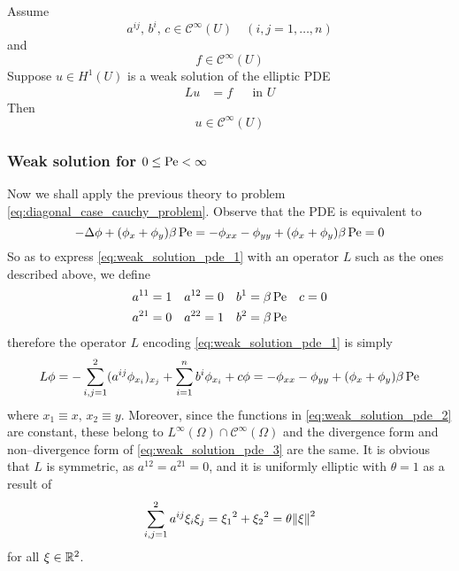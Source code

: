 \begin{theorem} \label{teo:infinite_differentiability_interior}
	Assume
	\[
		a^{ij}, \, b^i, \, c \in \mathcal{C}^\infty(U) \quad 
		(i,j = 1, \ldots, n)	
	\]
	and
	\[
		f \in \mathcal{C}^\infty(U)
	\]
	Suppose $u \in H^1(U)$ is a weak solution of the elliptic PDE
	\[
		\begin{aligned}
			L u &= f & &\text{in } U
		\end{aligned}	
	\]
	Then
	\[
		u \in \mathcal{C}^\infty(U)
	\]
\end{theorem}

\subsubsection*{Weak solution for \texorpdfstring{$0 \leq \mathrm{Pe} <
\infty$}{finite Péclet's number}}

Now we shall apply the previous theory to problem
\eqref{eq:diagonal_case_cauchy_problem}. Observe that the PDE is equivalent to
\begin{equation} \label{eq:weak_solution_pde_1}
	-\Delta \phi + (\phi_x + \phi_y) \beta \, \mathrm{Pe} = 
	-\phi_{xx} - \phi_{yy} + (\phi_x + \phi_y) \beta \, \mathrm{Pe} = 0
\end{equation}
So as to express \eqref{eq:weak_solution_pde_1} with an operator $L$ such as the
ones described above, we define
\begin{equation} \label{eq:weak_solution_pde_2}
	\begin{aligned}
		a^{11} &= 1 	& 	a^{12} &= 0 	& 	b^1 &= \beta \, \mathrm{Pe}	& 	c &= 0 \\
		a^{21} &= 0 	& 	a^{22} &= 1 	& 	b^2 &= \beta \, \mathrm{Pe}
	\end{aligned}
\end{equation}
therefore the operator $L$ encoding \eqref{eq:weak_solution_pde_1} is simply
\begin{equation} \label{eq:weak_solution_pde_3}
	L \phi = 
	-\sum_{i,j=1}^2 (a^{ij} \phi_{x_i})_{x_j} + \sum_{i=1}^n b^i \phi_{x_i} + c \phi =
	-\phi_{xx} - \phi_{yy} + (\phi_x + \phi_y) \beta \, \mathrm{Pe} 
\end{equation}
where $x_1 \equiv x, \, x_2 \equiv y$. Moreover, since the functions in
\eqref{eq:weak_solution_pde_2} are constant, these belong to $L^\infty(\Omega) \cap \mathcal{C}^\infty(\Omega)$
and the divergence form and non--divergence form of
\eqref{eq:weak_solution_pde_3} are the same. It is obvious that $L$ is
symmetric, as $a^{12} = a^{21} = 0$, and it is uniformly elliptic with $\theta = 1$ as a result of
\begin{equation*}
	\sum_{i,j=1}^2 a^{ij} \xi_i \xi_j = 
	{\xi_1}^2 + {\xi_2}^2 = \theta \norm{\xi}^2
\end{equation*}
for all $\xi \in \mathbb{R}^2$.

